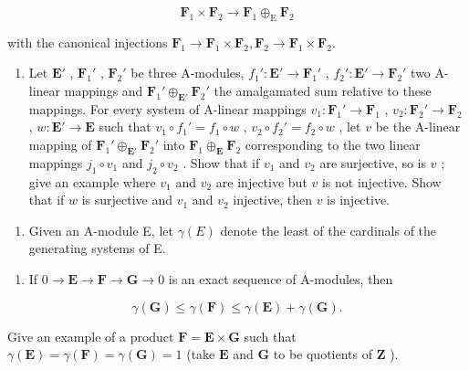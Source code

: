 \[
\mathbf {F} _ {1} \times \mathbf {F} _ {2} \rightarrow \mathbf {F} _ {1} \oplus_ {\mathrm{E}} \mathbf {F} _ {2}
\]

with the canonical injections \(\mathbf{F}_1\to \mathbf{F}_1\times \mathbf{F}_2,\mathbf{F}_2\rightarrow \mathbf{F}_1\times \mathbf{F}_2.\)

\begin{enumerate}
\def\labelenumi{(\alph{enumi})}
\setcounter{enumi}{1}
\tightlist
\item
  Let \(\mathbf{E}'\) , \(\mathbf{F}_1'\) , \(\mathbf{F}_2'\) be three A-modules, \(f_1': \mathbf{E}' \to \mathbf{F}_1'\) , \(f_2': \mathbf{E}' \to \mathbf{F}_2'\) two A-linear mappings and \(\mathbf{F}_1' \oplus_{\mathbf{E}'} \mathbf{F}_2'\) the amalgamated sum relative to these mappings. For every system of A-linear mappings \(v_1: \mathbf{F}_1' \to \mathbf{F}_1\) , \(v_2: \mathbf{F}_2' \to \mathbf{F}_2\) , \(w: \mathbf{E}' \to \mathbf{E}\) such that \(v_1 \circ f_1' = f_1 \circ w\) , \(v_2 \circ f_2' = f_2 \circ w\) , let \(v\) be the A-linear mapping of \(\mathbf{F}_1' \oplus_{\mathbf{E}'} \mathbf{F}_2'\) into \(\mathbf{F}_1 \oplus_{\mathbf{E}} \mathbf{F}_2\) corresponding to the two linear mappings \(j_1 \circ v_1\) and \(j_2 \circ v_2\) . Show that if \(v_1\) and \(v_2\) are surjective, so is \(v\) ; give an example where \(v_1\) and \(v_2\) are injective but \(v\) is not injective. Show that if \(w\) is surjective and \(v_1\) and \(v_2\) injective, then \(v\) is injective.
\end{enumerate}

\begin{enumerate}
\def\labelenumi{\arabic{enumi}.}
\setcounter{enumi}{5}
\tightlist
\item
  Given an A-module E, let \(\gamma(E)\) denote the least of the cardinals of the generating systems of E.
\end{enumerate}

\begin{enumerate}
\def\labelenumi{(\alph{enumi})}
\tightlist
\item
  If \(0 \to \mathbf{E} \to \mathbf{F} \to \mathbf{G} \to 0\) is an exact sequence of A-modules, then
\end{enumerate}

\[
\gamma (\mathbf {G}) \leqslant \gamma (\mathbf {F}) \leqslant \gamma (\mathbf {E}) + \gamma (\mathbf {G}).
\]

Give an example of a product \(\mathbf{F} = \mathbf{E} \times \mathbf{G}\) such that \(\gamma(\mathbf{E}) = \gamma(\mathbf{F}) = \gamma(\mathbf{G}) = 1\) (take \(\mathbf{E}\) and \(\mathbf{G}\) to be quotients of \(\mathbf{Z}\) ).


